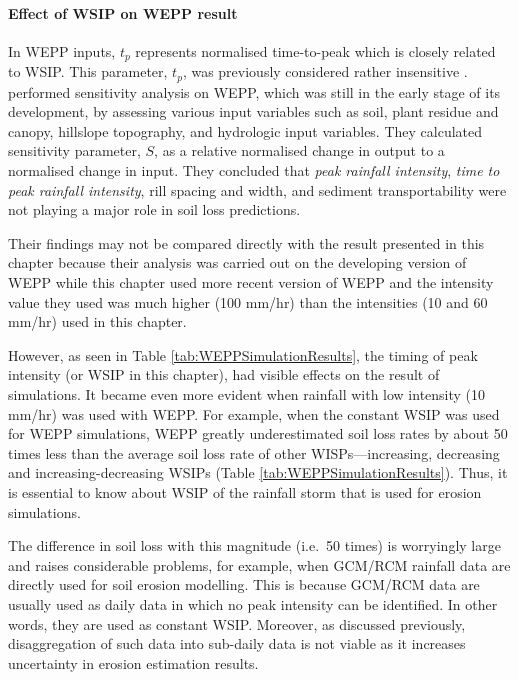 \paragraph{Effect of WSIP on WEPP result} In WEPP inputs, $t_p$ represents
normalised time-to-peak which is closely related to WSIP. This parameter, $t_p$,
was previously considered rather insensitive \citep{nearing1990-839}.
\citet{nearing1990-839} performed sensitivity analysis on WEPP, which was
still in the early stage of its development, by assessing various input
variables such as soil, plant residue and canopy, hillslope topography, and
hydrologic input variables. They calculated sensitivity parameter, $S$, as a
relative normalised change in output to a normalised change in input.
They concluded that \emph{peak rainfall intensity}, \emph{time to peak rainfall
intensity}, rill spacing and width, and sediment transportability were not
playing a major role in soil loss predictions.

Their findings may not be compared directly with the result presented in this
chapter because their analysis was carried out on the developing version of WEPP
while this chapter used more recent version of WEPP and the intensity value they
used was much higher (100 mm/hr) than the intensities (10 and 60 mm/hr) used in
this chapter.

However, as seen in Table \ref{tab:WEPPSimulationResults}, the timing of peak
intensity (or WSIP in this chapter), had visible effects on the result of
simulations. It became even more evident when rainfall with low intensity (10
mm/hr) was used with WEPP. For example, when the constant WSIP was used for WEPP
simulations, WEPP greatly underestimated soil loss rates by about 50 times less
than the average soil loss rate of other WISPs---increasing, decreasing and
increasing-decreasing WSIPs (Table \ref{tab:WEPPSimulationResults}). Thus, it is
essential to know about WSIP of the rainfall storm that is used for erosion
simulations.

The difference in soil loss with this magnitude (i.e.\ 50 times) is worryingly
large and raises considerable problems, for example, when GCM/RCM rainfall data
are directly used for soil erosion modelling. This is because GCM/RCM data are
usually used as daily data in which no peak intensity can be identified. In
other words, they are used as constant WSIP. Moreover, as discussed previously,
disaggregation of such data into sub-daily data is not viable as it increases
uncertainty in erosion estimation results.

